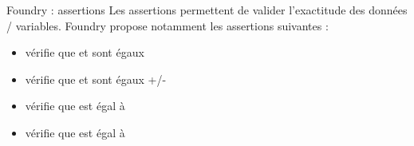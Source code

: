 \begin{frame}[fragile]{Foundry : assertions}
  Les assertions permettent de valider l'exactitude des données / variables.
  Foundry propose notamment les assertions suivantes :

  \begin{itemize}
    \item {} vérifie que  et  sont égaux
    \item {} vérifie que  et  sont égaux +/- 
    \item {} vérifie que  est égal à 
    \item {} vérifie que  est égal à 
  \end{itemize}
\end{frame}